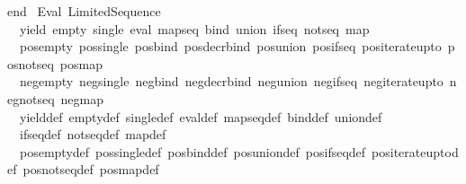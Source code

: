 \begin{isabellebody}
\isanewline
end{\isacharsemicolon}{\kern0pt}\isanewline
{\isacartoucheclose}%
\endisatagML
{\isafoldML}%
%
\isadelimML
\isanewline
%
\endisadelimML
\isanewline
{}\isamarkupfalse%
\ Eval\ Limited{\isacharunderscore}{\kern0pt}Sequence\isanewline
\isanewline
\isanewline
{}\isamarkupfalse%
\ {\isacharparenleft}{\kern0pt}\ yield\ empty\ single\ eval\ map{\isacharunderscore}{\kern0pt}seq\ bind\ union\ if{\isacharunderscore}{\kern0pt}seq\ not{\isacharunderscore}{\kern0pt}seq\ map\isanewline
\ \ pos{\isacharunderscore}{\kern0pt}empty\ pos{\isacharunderscore}{\kern0pt}single\ pos{\isacharunderscore}{\kern0pt}bind\ pos{\isacharunderscore}{\kern0pt}decr{\isacharunderscore}{\kern0pt}bind\ pos{\isacharunderscore}{\kern0pt}union\ pos{\isacharunderscore}{\kern0pt}if{\isacharunderscore}{\kern0pt}seq\ pos{\isacharunderscore}{\kern0pt}iterate{\isacharunderscore}{\kern0pt}upto\ pos{\isacharunderscore}{\kern0pt}not{\isacharunderscore}{\kern0pt}seq\ pos{\isacharunderscore}{\kern0pt}map\isanewline
\ \ neg{\isacharunderscore}{\kern0pt}empty\ neg{\isacharunderscore}{\kern0pt}single\ neg{\isacharunderscore}{\kern0pt}bind\ neg{\isacharunderscore}{\kern0pt}decr{\isacharunderscore}{\kern0pt}bind\ neg{\isacharunderscore}{\kern0pt}union\ neg{\isacharunderscore}{\kern0pt}if{\isacharunderscore}{\kern0pt}seq\ neg{\isacharunderscore}{\kern0pt}iterate{\isacharunderscore}{\kern0pt}upto\ neg{\isacharunderscore}{\kern0pt}not{\isacharunderscore}{\kern0pt}seq\ neg{\isacharunderscore}{\kern0pt}map\isanewline
\isanewline
{}\isamarkupfalse%
\ {\isacharparenleft}{\kern0pt}\ yield{\isacharunderscore}{\kern0pt}def\ empty{\isacharunderscore}{\kern0pt}def\ single{\isacharunderscore}{\kern0pt}def\ eval{\isacharunderscore}{\kern0pt}def\ map{\isacharunderscore}{\kern0pt}seq{\isacharunderscore}{\kern0pt}def\ bind{\isacharunderscore}{\kern0pt}def\ union{\isacharunderscore}{\kern0pt}def\isanewline
\ \ if{\isacharunderscore}{\kern0pt}seq{\isacharunderscore}{\kern0pt}def\ not{\isacharunderscore}{\kern0pt}seq{\isacharunderscore}{\kern0pt}def\ map{\isacharunderscore}{\kern0pt}def\isanewline
\ \ pos{\isacharunderscore}{\kern0pt}empty{\isacharunderscore}{\kern0pt}def\ pos{\isacharunderscore}{\kern0pt}single{\isacharunderscore}{\kern0pt}def\ pos{\isacharunderscore}{\kern0pt}bind{\isacharunderscore}{\kern0pt}def\ pos{\isacharunderscore}{\kern0pt}union{\isacharunderscore}{\kern0pt}def\ pos{\isacharunderscore}{\kern0pt}if{\isacharunderscore}{\kern0pt}seq{\isacharunderscore}{\kern0pt}def\ pos{\isacharunderscore}{\kern0pt}iterate{\isacharunderscore}{\kern0pt}upto{\isacharunderscore}{\kern0pt}def\ pos{\isacharunderscore}{\kern0pt}not{\isacharunderscore}{\kern0pt}seq{\isacharunderscore}{\kern0pt}def\ pos{\isacharunderscore}{\kern0pt}map{\isacharunderscore}{\kern0pt}def\isanewline

\end{isabellebody}
